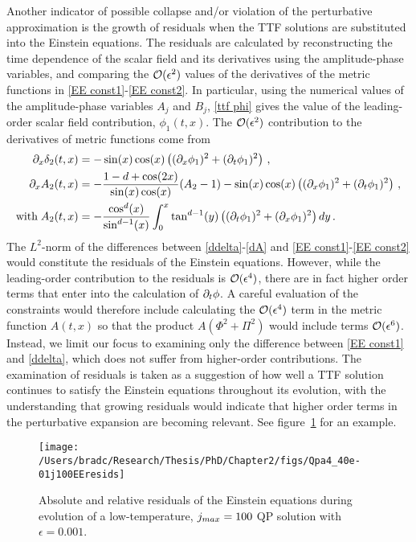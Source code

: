 \documentclass[../PhD.tex]{subfiles}
\begin{document}
Another indicator of possible collapse and/or violation of the perturbative approximation is the growth of residuals when the TTF solutions are substituted into the Einstein equations. The residuals are calculated by reconstructing the time dependence of the scalar field and its derivatives using the amplitude-phase variables, and comparing the $\mathcal O(\epsilon^2)$ values of the derivatives of the metric functions in \eqref{EE const1}-\eqref{EE const2}. In particular, using the numerical values of the amplitude-phase variables $A_j$ and $B_j$, \eqref{ttf phi} gives the value of the leading-order scalar field contribution, $\phi_1(t,x)$. The $\mathcal O(\epsilon^2)$ contribution to the derivatives of metric functions come from
\begin{align}
\label{ddelta}
\partial_x \delta_2(t,x) &= -\sin(x) \cos(x) \left( (\partial_x \phi_1)^2 + (\partial_t \phi_1)^2 \right) \, , \\
\label{dA}
\partial_x A_2(t,x) &= -\frac{1 - d + \cos(2x)}{\sin(x) \cos(x)}(A_2 - 1) - \sin(x) \cos(x) \left( (\partial_x \phi_1)^2 + (\partial_t \phi_1)^2 \right) \, , \\
\text{with} \; A_2(t,x) &= - \frac{\cos^d(x)}{\sin^{d-1}(x)} \int^x_0 \tan^{d-1}(y) \left( (\partial_t \phi_1)^2 + (\partial_x \phi_1)^2 \right) dy \, .
\end{align}
The $L^2$-norm of the differences between \eqref{ddelta}-\eqref{dA} and \eqref{EE const1}-\eqref{EE const2} would constitute the residuals of the Einstein equations. However, while the leading-order contribution to the residuals is $\mathcal O(\epsilon^4)$, there are in fact higher order terms that enter into the calculation of $\partial_t \phi$. A careful evaluation of the constraints would therefore include calculating the $\mathcal O(\epsilon^4)$ term in the metric function $A(t,x)$ so that the product $A ( \Phi^2 + \Pi^2)$ would include terms $\mathcal O(\epsilon^6)$. Instead, we limit our focus to examining only the difference between \eqref{EE const1} and \eqref{ddelta}, which does not suffer from higher-order contributions. The examination of residuals is taken as a suggestion of how well a TTF solution continues to satisfy the Einstein equations throughout its evolution, with the understanding that growing residuals would indicate that higher order terms in the perturbative expansion are becoming relevant. See figure~\ref{fig: qpEEresids} for an example.

\begin{figure}[h]
	\centering
	\texttt{[image: /Users/bradc/Research/Thesis/PhD/Chapter2/figs/Qpa4\_40e-01j100EEresids]}
	\caption[Absolute and relative residuals for a low-temperature QP solution]{Absolute and relative residuals of the Einstein equations during evolution of a low-temperature, $j_{max} = 100$ QP solution with $\epsilon = 0.001$.}
	\label{fig: qpEEresids}
\end{figure}
\end{document}
